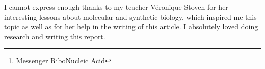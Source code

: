     \begin{abstract}        
        In a context of a pandemic and major doubts towards vaccination among populations, this paper deals with vaccine strategies, especially how mRNA vaccines are revolutionizing them.
        It is clear that immunology represents a complex field of science,
            and nowadays the breakthroughs in biotechnologies are offering new possibilities to accelerate vaccine development, efficiency and safety as well as a better understanding
            our immune system.
        This paper aims at summarizing the different vaccine techniques with a special attention to mRNA vaccines\footnote{Messenger RiboNucleic Acid}, in order to
            have an overview of the current vaccine strategies which are going to evolve.
    \end{abstract}

        
    \begin{remerciements}
        I cannot express enough thanks to my teacher Véronique Stoven for her interesting lessons about molecular and synthetic biology,
            which inspired me this topic as well as for her help in the writing of this article.
        I absolutely loved doing research and writing this report.
    \end{remerciements}


    \tableofcontents


    \newpage

    \makeatother